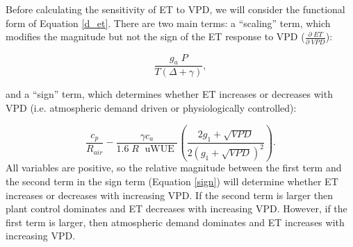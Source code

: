 \documentclass[draft,linenumbers]{agujournal}
\begin{document}
Before calculating the sensitivity of ET to VPD, we will consider the
functional form of Equation \ref{d_et}. There are two main terms: a
``scaling'' term, which modifies the magnitude but not the sign of the
ET response to VPD ($\frac{\partial \; ET}{\partial \; VPD}$):

\begin{equation}
  \frac{g_a \; P}{T(\Delta + \gamma)},
\end{equation}

and a ``sign'' term, which determines whether ET increases or
decreases with VPD (i.e. atmospheric demand driven or physiologically
controlled):

\begin{equation}
  \label{sign}
  \frac{c_p}{R_{air}} - \frac{\gamma c_a }{1.6 \; R\; \text{ uWUE }} \left( \frac{2 g_1 + \sqrt{VPD}}{2 (g_1 + \sqrt{VPD})^2}\right).
\end{equation}
All variables are positive, so the relative magnitude between the
first term and the second term in the sign term (Equation \ref{sign})
will determine whether ET increases or decreases with increasing
VPD. If the second term is larger then plant control dominates and ET
decreases with increasing VPD. However, if the first term is larger,
then atmospheric demand dominates and ET increases with increasing
VPD.
\end{document}
